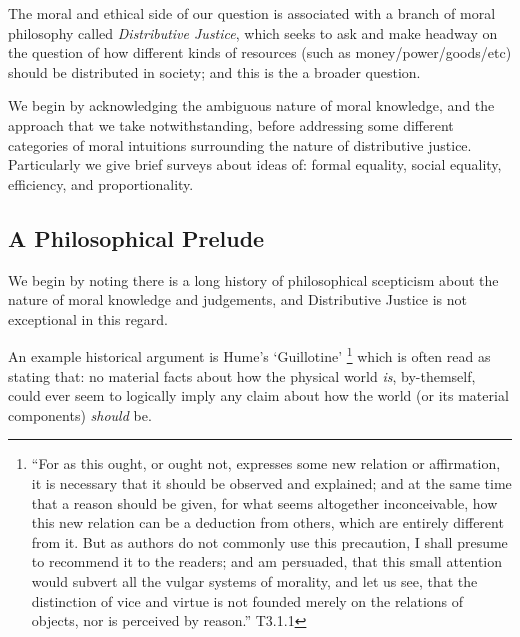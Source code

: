 
The moral and ethical side of our question is associated with a branch of moral philosophy called \textit{Distributive Justice}, which seeks to ask and make headway on the question of how different kinds of resources (such as money/power/goods/etc) should be distributed in society; and this is the a broader question.

We begin by acknowledging the ambiguous nature of moral knowledge, and the approach that we take notwithstanding, before addressing some different categories of moral intuitions surrounding the nature of distributive justice.
Particularly we give brief surveys about ideas of: formal equality, social equality, efficiency, and proportionality.

\subsection{A Philosophical Prelude}

We begin by noting there is a long history of philosophical scepticism about the nature of moral knowledge and judgements, and Distributive Justice is not exceptional in this regard.

An example historical argument is Hume's `Guillotine' \cite{HumeGutenberg}\footnote{``For as this ought, or ought not, expresses some new relation or affirmation, it is necessary that it should be observed and explained; and at the same time that a reason should be given, for what seems altogether inconceivable, how this new relation can be a deduction from others, which are entirely different from it. But as authors do not commonly use this precaution, I shall presume to recommend it to the readers; and am persuaded, that this small attention would subvert all the vulgar systems of morality, and let us see, that the distinction of vice and virtue is not founded merely on the relations of objects, nor is perceived by reason.'' T3.1.1} which is often read as stating that: no material facts about how the physical world \textit{is}, by-themself, could ever seem to logically imply any claim about how the world (or its material components) \textit{should} be.

